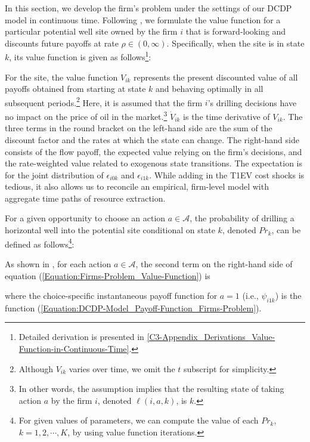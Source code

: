 In this section, we develop the firm's problem under the settings of our DCDP model in continuous time. Following \cite{Estimation-of-Dynamic-Discrete-Choice-Models-in-Continuous-Time_ABBE_2016}, we formulate the value function for a particular potential well site owned by the firm $i$ that is forward-looking and discounts future payoffs at rate $\rho \in (0, \infty)$. Specifically, when the site is in state $k$, its value function is given as follows\footnote{Detailed derivation is presented in \ref{C3-Appendix_Derivations_Value-Function-in-Continuous-Time}.}:

For the site, the value function $V_{ik}$ represents the present discounted value of all payoffs obtained from starting at state $k$ and behaving optimally in all subsequent periods.\footnote{Although $V_{ik}$ varies over time, we omit the $t$ subscript for simplicity.} Here, it is assumed that the firm $i$'s drilling decisions have no impact on the price of oil in the market.\footnote{In other words, the assumption implies that the resulting state of taking action $a$ by the firm $i$, denoted $\ell(i, a, k)$, is $k$.} $\dot{V}_{ik}$ is the time derivative of $V_{ik}$. The three terms in the round bracket on the left-hand side are the sum of the discount factor and the rates at which the state can change. The right-hand side consists of the flow payoff, the expected value relying on the firm's decisions, and the rate-weighted value related to exogenous state transitions. The expectation is for the joint distribution of $\epsilon_{i0k}$ and $\epsilon_{i1k}$. While adding in the T1EV cost shocks is tedious, it also allows us to reconcile an empirical, firm-level model with aggregate time paths of resource extraction. 

For a given opportunity to choose an action $a \in \mathcal{A}$, the probability of drilling a horizontal well into the potential site conditional on state $k$, denoted $Pr_{k}$, can be defined as follows\footnote{For given values of parameters, we can compute the value of each $Pr_{k}$, $k = 1, 2, \cdots, K$, by using value function iterations.}:

As shown in \cite{Estimation-of-Dynamic-Discrete-Choice-Models-in-Continuous-Time_ABBE_2016}, for each action $a \in \mathcal{A}$, the second term on the right-hand side of equation (\ref{Equation:Firms-Problem_Value-Function}) is

where the choice-specific instantaneous payoff function for $a = 1$ (i.e., $\psi_{i1k}$) is the function (\ref{Equation:DCDP-Model_Payoff-Function_Firms-Problem}).

